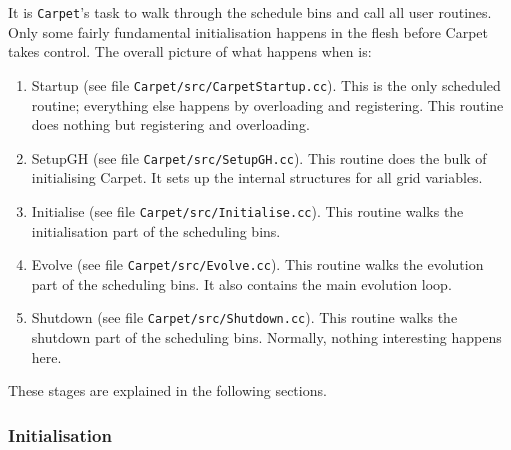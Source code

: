 \documentclass{article}
\begin{document}
   It is \texttt{Carpet}'s task to walk through the schedule bins and
   call all user routines.  Only some fairly fundamental
   initialisation happens in the flesh before Carpet takes control.
   The overall picture of what happens when is:
\begin{enumerate}
\item
   Startup (see file \texttt{Carpet/src/CarpetStartup.cc}).  This is
   the only scheduled routine; everything else happens by overloading
   and registering.  This routine does nothing but registering and
   overloading.
\item
   SetupGH (see file \texttt{Carpet/src/SetupGH.cc}).  This routine
   does the bulk of initialising Carpet.  It sets up the internal
   structures for all grid variables.
\item
   Initialise (see file \texttt{Carpet/src/Initialise.cc}).  This
   routine walks the initialisation part of the scheduling bins.
\item
   Evolve (see file \texttt{Carpet/src/Evolve.cc}).  This routine
   walks the evolution part of the scheduling bins.  It also contains
   the main evolution loop.
\item
   Shutdown (see file \texttt{Carpet/src/Shutdown.cc}).  This routine
   walks the shutdown part of the scheduling bins.  Normally, nothing
   interesting happens here.
\end{enumerate}
   These stages are explained in the following sections.



\subsubsection{Initialisation}
\end{document}
